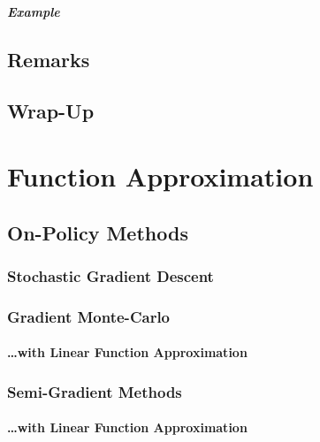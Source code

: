 				\paragraph{Example} %

	\section{Remarks} %

	\section{Wrap-Up} %

\chapter{Function Approximation} %

	\section{On-Policy Methods} %

		\subsection{Stochastic Gradient Descent} %

		\subsection{Gradient Monte-Carlo} %

			\subsubsection{\dots with Linear Function Approximation} %

		\subsection{Semi-Gradient Methods} %

			\subsubsection{\dots with Linear Function Approximation} %

